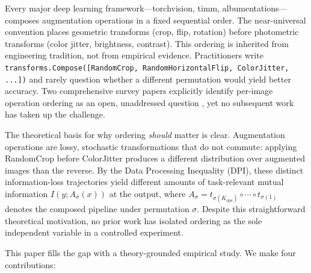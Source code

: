 \documentclass{article}
\begin{document}
Every major deep learning framework---torchvision, timm, albumentations---composes augmentation operations in a fixed sequential order. The near-universal convention places geometric transforms (crop, flip, rotation) before photometric transforms (color jitter, brightness, contrast). This ordering is inherited from engineering tradition, not from empirical evidence. Practitioners write \texttt{transforms.Compose([RandomCrop, RandomHorizontalFlip, ColorJitter, ...])} and rarely question whether a different permutation would yield better accuracy. Two comprehensive survey papers explicitly identify per-image operation ordering as an open, unaddressed question \cite{cheung2023augsurvey, yang2023augsurvey}, yet no subsequent work has taken up the challenge.

The theoretical basis for why ordering \emph{should} matter is clear. Augmentation operations are lossy, stochastic transformations that do not commute: applying RandomCrop before ColorJitter produces a different distribution over augmented images than the reverse. By the Data Processing Inequality (DPI), these distinct information-loss trajectories yield different amounts of task-relevant mutual information $I(y; A_\sigma(x))$ at the output, where $A_\sigma = t_{\sigma(K_\text{ops})} \circ \cdots \circ t_{\sigma(1)}$ denotes the composed pipeline under permutation $\sigma$. Despite this straightforward theoretical motivation, no prior work has isolated ordering as the sole independent variable in a controlled experiment.

This paper fills the gap with a theory-grounded empirical study. We make four contributions:
\end{document}

